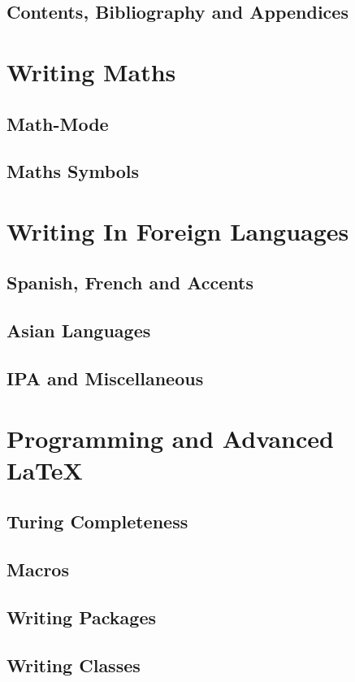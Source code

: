 \documentclass[12pt,a4paper]{article}
\begin{document}
\subsection{Contents, Bibliography and Appendices}

\newpage
\section{Writing Maths}

\subsection{Math-Mode}


\subsection{Maths Symbols}

\newpage
\section{Writing In Foreign Languages}

\subsection{Spanish, French and Accents}

\subsection{Asian Languages}

\subsection{IPA and Miscellaneous}

\newpage
\section{Programming and Advanced LaTeX}

\subsection{Turing Completeness}

\subsection{Macros}

\subsection{Writing Packages}

\subsection{Writing Classes}

%
\end{document}
